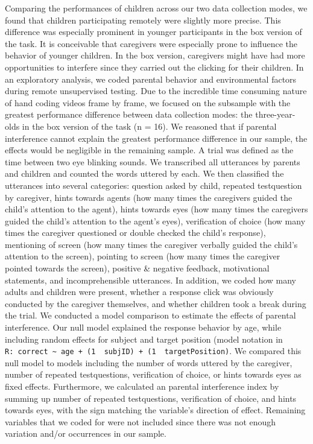 \documentclass[
  man,floatsintext]{apa6}
\begin{document}
Comparing the performances of children across our two data collection modes, we found that children participating remotely were slightly more precise. This difference was especially prominent in younger participants in the box version of the task. It is conceivable that caregivers were especially prone to influence the behavior of younger children. In the box version, caregivers might have had more opportunities to interfere since they carried out the clicking for their children.
In an exploratory analysis, we coded parental behavior and environmental factors during remote unsupervised testing. Due to the incredible time consuming nature of hand coding videos frame by frame, we focused on the subsample with the greatest performance difference between data collection modes: the three-year-olds in the box version of the task (n = 16). We reasoned that if parental interference cannot explain the greatest performance difference in our sample, the effects would be negligible in the remaining sample.
A trial was defined as the time between two eye blinking sounds. We transcribed all utterances by parents and children and counted the words uttered by each. We then classified the utterances into several categories: question asked by child, repeated testquestion by caregiver, hints towards agents (how many times the caregivers guided the child's attention to the agent), hints towards eyes (how many times the caregivers guided the child's attention to the agent's eyes), verification of choice (how many times the caregiver questioned or double checked the child's response), mentioning of screen (how many times the caregiver verbally guided the child's attention to the screen), pointing to screen (how many times the caregiver pointed towards the screen), positive \& negative feedback, motivational statements, and incomprehensible utterances.
In addition, we coded how many adults and children were present, whether a response click was obviously conducted by the caregiver themselves, and whether children took a break during the trial.
We conducted a model comparison to estimate the effects of parental interference. Our null model explained the response behavior by age, while including random effects for subject and target position (model notation in \texttt{R:\ correct\ \textasciitilde{}\ age\ +\ (1\ \textbar{}\ subjID)\ +\ (1\ \textbar{}\ targetPosition)}. We compared this null model to models including the number of words uttered by the caregiver, number of repeated testquestions, verification of choice, or hints towards eyes as fixed effects. Furthermore, we calculated an parental interference index by summing up number of repeated testquestions, verification of choice, and hints towards eyes, with the sign matching the variable's direction of effect. Remaining variables that we coded for were not included since there was not enough variation and/or occurrences in our sample.
\end{document}
